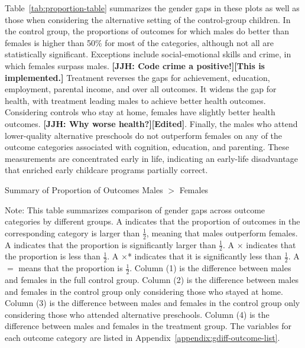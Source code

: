 Table~\ref{tab:proportion-table} summarizes the gender gaps in these plots as well as those when considering the alternative setting of the control-group children. In the control group, the proportions of outcomes for which males do better than females is higher than 50\% for most of the categories, although not all are statistically significant. Exceptions include social-emotional skills and crime, in which females surpass males. \textbf{[JJH: Code crime a positive!][This is implemented.]} Treatment reverses the gaps for achievement, education, employment, parental income, and over all outcomes. It widens the gap for health, with treatment leading males to achieve better health outcomes. Considering controls who stay at home, females have slightly better health outcomes. \textbf{[JJH: Why worse health?][Edited]}. Finally, the males who attend lower-quality alternative preschools do not outperform females on any of the outcome categories associated with cognition, education, and parenting. These measurements are concentrated early in life, indicating an early-life disadvantage that enriched early childcare programs partially correct.

\begin{table}[H]
\centering
\caption{Summary of Proportion of Outcomes Males $>$ Females}
\label{tab:proportion-table}
\begin{threeparttable}

\begin{tablenotes}
\footnotesize
\item Note: This table summarizes comparison of gender gaps across outcome categories by different groups. A \checkmark indicates that the proportion of outcomes in the corresponding category is larger than $\frac{1}{2}$, meaning that males outperform females. A \checkmark* indicates that the proportion is significantly larger than $\frac{1}{2}$. A $\times$ indicates that the proportion is less than $\frac{1}{2}$. A $\times$* indicates that it is significantly less than $\frac{1}{2}$. A $=$ means that the proportion is $\frac{1}{2}$. Column (1) is the difference between males and females in the full control group.  Column (2) is the difference between males and females in the control group only considering those who stayed at home. Column (3) is the difference between males and females in the control group only considering those who attended alternative preschools. Column (4) is the difference between males and females in the treatment group. The variables for each outcome category are listed in Appendix~\ref{appendix:gdiff-outcome-list}.
\end{tablenotes}
\end{threeparttable}
\end{table}

